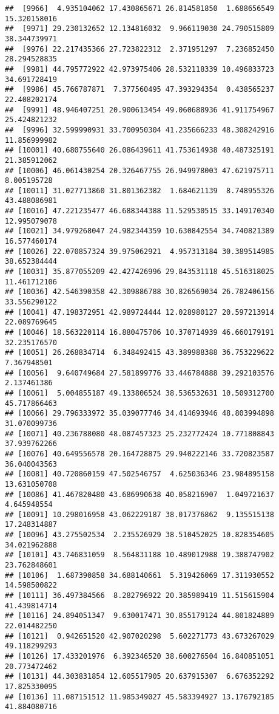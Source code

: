 \documentclass[
]{article}
\begin{document}
\begin{verbatim}
##  [9966]  4.935104062 17.430865671 26.814581850  1.688656549 15.320158016
##  [9971] 29.230132652 12.134816032  9.966119030 24.790515809 38.344739971
##  [9976] 22.217435366 27.723822312  2.371951297  7.236852450 28.294528835
##  [9981] 44.795772922 42.973975406 28.532118339 10.496833723 34.691728419
##  [9986] 45.766787871  7.377560495 47.393294354  0.438565237 22.408202174
##  [9991] 48.946407251 20.900613454 49.060688936 41.911754967 25.424821232
##  [9996] 32.599990931 33.700950304 41.235666233 48.308242916 11.856999982
## [10001] 40.680755640 26.086439611 41.753614938 40.487325191 21.385912062
## [10006] 46.061430254 20.326467755 26.949978003 47.621975711  8.005195728
## [10011] 31.027713860 31.801362382  1.684621139  8.748955326 43.488086981
## [10016] 47.221235477 46.688344388 11.529530515 33.149170340 12.995079078
## [10021] 34.979268047 24.982344359 10.630842554 34.740821389 16.577460174
## [10026] 22.070857324 39.975062921  4.957313184 30.389514985 38.652384444
## [10031] 35.877055209 42.427426996 29.843531118 45.516318025 11.461712106
## [10036] 42.546390358 42.309886788 30.826569034 26.782406156 33.556290122
## [10041] 47.198372951 42.989724444 12.028980127 20.597213914 22.089769645
## [10046] 18.563220114 16.880475706 10.370714939 46.660179191 32.235176570
## [10051] 26.268834714  6.348492415 43.389988388 36.753229622  7.367948501
## [10056]  9.640749684 27.581899776 33.446784888 39.292103576  2.137461386
## [10061]  5.004855187 49.133806524 38.536532631 10.509312700 45.717866463
## [10066] 29.796333972 35.039077746 34.414693946 48.803994898 31.070099736
## [10071] 40.236788080 48.087457323 25.232772424 10.771808843 37.939762266
## [10076] 40.649556578 20.164728875 29.940222146 33.720823587 36.040043563
## [10081] 40.720860159 47.502546757  4.625036346 23.984895158 13.631050708
## [10086] 41.467820480 43.686990638 40.058216907  1.049721637  4.645948554
## [10091] 10.298016958 43.062229187 38.017376862  9.135515138 17.248314887
## [10096] 43.275502534  2.235526929 38.510452025 10.828354605 34.021962888
## [10101] 43.746831059  8.564831188 10.489012988 19.388747902 23.762848601
## [10106]  1.687390858 34.688140661  5.319426069 17.311930552 14.598500822
## [10111] 36.497384566  8.282796922 20.385989419 11.515615904 41.439814714
## [10116] 24.894051347  9.630017471 30.855179124 44.801824889 22.014482250
## [10121]  0.942651520 42.907020298  5.602271773 43.673267029 49.118299293
## [10126] 17.433201976  6.392346520 38.600276504 16.840851051 20.773472462
## [10131] 44.303831854 12.605517905 20.637915307  6.676352292 17.825330095
## [10136] 11.087151512 11.985349027 45.583394927 13.176792185 41.884080716

\end{verbatim}
\end{document}

